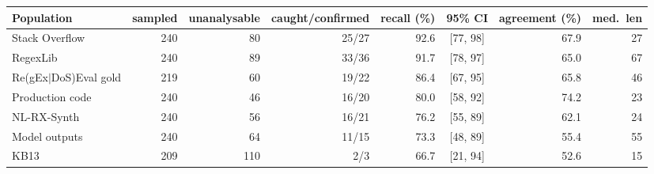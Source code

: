\begin{tabular}{lrrrrcrr}
\toprule
Population & sampled & unanalysable & caught/confirmed & recall (\%) & 95\% CI & agreement (\%) & med.\ len \\
\midrule
Stack Overflow & 240 & 80 & 25/27 & 92.6 & [77, 98] & 67.9 & 27 \\
RegexLib & 240 & 89 & 33/36 & 91.7 & [78, 97] & 65.0 & 67 \\
Re(gEx$|$DoS)Eval gold & 219 & 60 & 19/22 & 86.4 & [67, 95] & 65.8 & 46 \\
Production code & 240 & 46 & 16/20 & 80.0 & [58, 92] & 74.2 & 23 \\
NL-RX-Synth & 240 & 56 & 16/21 & 76.2 & [55, 89] & 62.1 & 24 \\
Model outputs & 240 & 64 & 11/15 & 73.3 & [48, 89] & 55.4 & 55 \\
KB13 & 209 & 110 & 2/3 & 66.7 & [21, 94] & 52.6 & 15 \\
\bottomrule
\end{tabular}
